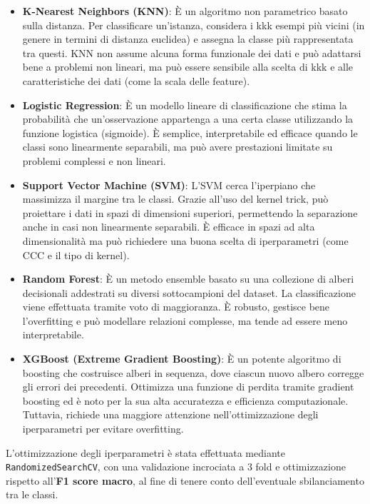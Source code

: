 \documentclass[minted, draw]{../tex/hebdomon}
\begin{document}
\begin{itemize}

\item \textbf{K-Nearest Neighbors (KNN)}: È un algoritmo non parametrico basato sulla distanza. Per classificare un'istanza, considera i kkk esempi più vicini (in genere in termini di distanza euclidea) e assegna la classe più rappresentata tra questi. KNN non assume alcuna forma funzionale dei dati e può adattarsi bene a problemi non lineari, ma può essere sensibile alla scelta di kkk e alle caratteristiche dei dati (come la scala delle feature).

\item \textbf{Logistic Regression}: È un modello lineare di classificazione che stima la probabilità che un'osservazione appartenga a una certa classe utilizzando la funzione logistica (sigmoide). È semplice, interpretabile ed efficace quando le classi sono linearmente separabili, ma può avere prestazioni limitate su problemi complessi e non lineari.

\item \textbf{Support Vector Machine (SVM)}: L'SVM cerca l'iperpiano che massimizza il margine tra le classi. Grazie all'uso del kernel trick, può proiettare i dati in spazi di dimensioni superiori, permettendo la separazione anche in casi non linearmente separabili. È efficace in spazi ad alta dimensionalità ma può richiedere una buona scelta di iperparametri (come CCC e il tipo di kernel).

\item \textbf{Random Forest}: È un metodo ensemble basato su una collezione di alberi decisionali addestrati su diversi sottocampioni del dataset. La classificazione viene effettuata tramite voto di maggioranza. È robusto, gestisce bene l'overfitting e può modellare relazioni complesse, ma tende ad essere meno interpretabile.

\item \textbf{XGBoost (Extreme Gradient Boosting)}: È un potente algoritmo di boosting che costruisce alberi in sequenza, dove ciascun nuovo albero corregge gli errori dei precedenti. Ottimizza una funzione di perdita tramite gradient boosting ed è noto per la sua alta accuratezza e efficienza computazionale. Tuttavia, richiede una maggiore attenzione nell’ottimizzazione degli iperparametri per evitare overfitting.

\end{itemize}

L'ottimizzazione degli iperparametri è stata effettuata mediante \texttt{RandomizedSearchCV}, con una validazione incrociata a 3 fold e ottimizzazione rispetto all'\textbf{F1 score macro}, al fine di tenere conto dell'eventuale sbilanciamento tra le classi.
\end{document}
